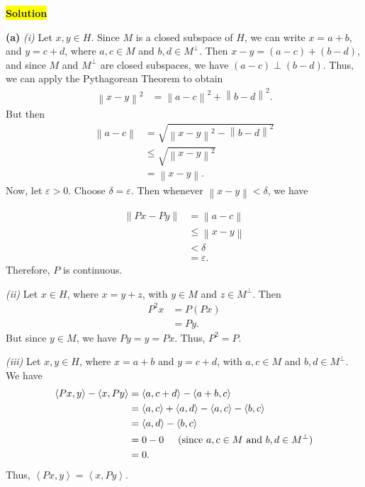 \documentclass[12pt]{article}
\newcommand\norm[1]{\left\lVert#1\right\rVert}
\newcommand{\mybox}{%
    \collectbox{%
        \setlength{\fboxsep}{2pt}%
        \fbox{\BOXCONTENT}%
    }%
}
\begin{document}
\noindent\mybox{\colorbox{yellow}{\textbf{Solution}}}\hspace{3mm}\hrulefill

\noindent \textbf{(a)} \textit{(i)} Let $x,y\in H$. Since $M$ is a closed subspace of $H$, we can write $x = a + b$, and $y=c + d$, where $a,c\in M$ and $b,d\in M^{\perp}.$ Then $x-y = (a-c) + (b-d)$, and since $M$ and $M^{\perp}$ are closed subspaces, we have $(a-c) \perp (b-d)$. Thus, we can apply the Pythagorean Theorem to obtain 
\vspace{-0.5cm}
\begin{align}
    \norm{x-y}^2 &= \norm{a-c}^2 + \norm{b-d}^2.
\end{align}
\vspace{-1cm}
But then
\begin{align}
    \norm{a-c} &= \sqrt{\norm{x-y}^2-\norm{b-d}^2} \\
    &\leq \sqrt{\norm{x-y}^2} \\
    &= \norm{x-y}.
\end{align}
\vspace{-0.5cm}
Now, let $\varepsilon > 0$. Choose $\delta = \varepsilon$. Then whenever $\norm{x-y} < \delta$, we have

\begin{align}
    \norm{Px - Py} &= \norm{a-c} \\
    &\leq \norm{x-y} \\
    &< \delta \\
    &= \varepsilon.
\end{align}
Therefore, $P$ is continuous.

\textit{(ii)} Let $x\in H$, where $x=y+z$, with $y\in M$ and $z\in M^{\perp}$. Then
\begin{align}
    P^2x &= P(Px) \\
    &= Py.
\end{align}
But since $y\in M$, we have $Py = y = Px$. Thus, $P^2 = P.$

\textit{(iii)} Let $x,y\in H$, where $x = a+b$ and $y=c+d$, with $a,c\in M$ and $b,d\in M^{\perp}$. We have
\begin{align}
    \left<Px, y\right> - \left<x, Py\right> &= \left<a, c+d\right> - \left<a+b, c\right> \\
    &= \left<a,c\right> + \left<a,d\right> - \left<a,c\right> - \left<b,c\right> \\
    &= \left<a,d\right> - \left<b,c\right> \\
    &= 0 - 0 \hspace{5mm} \text{(since } a,c\in M \text{ and } b,d\in M^{\perp}\text{)}\\
    &= 0.
\end{align}
Thus, $\left<Px, y\right> = \left<x, Py\right>$. 
\end{document}

